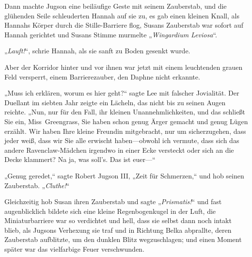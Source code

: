Dann machte Jugson eine beiläufige Geste mit seinem Zauberstab, und die glühenden Seile schleuderten Hannah auf sie zu, es gab einen kleinen Knall, als Hannahs Körper durch die Stille-Barriere flog, Susans Zauberstab war sofort auf Hannah gerichtet und Susans Stimme murmelte „\emph{Wingardium Leviosa}“.

„\emph{Lauft!}“, schrie Hannah, als sie sanft zu Boden gesenkt wurde.

Aber der Korridor hinter und vor ihnen war jetzt mit einem leuchtenden grauen Feld versperrt, einem Barrierezauber, den Daphne nicht erkannte.

„Muss ich erklären, worum es hier geht?“ sagte Lee mit falscher Jovialität. Der Duellant im siebten Jahr zeigte ein Lächeln, das nicht bis zu seinen Augen reichte. „Nun, nur für den Fall, ihr kleinen Unannehmlichkeiten, und das schließt Sie ein, Miss~Greengrass, Sie haben schon genug Ärger gemacht und genug Lügen erzählt. Wir haben Ihre kleine Freundin mitgebracht, nur um sicherzugehen, dass jeder weiß, dass wir Sie alle erwischt haben—obwohl ich vermute, dass sich das andere Ravenclaw-Mädchen irgendwo in einer Ecke versteckt oder sich an die Decke klammert? Na ja, was soll’s. Das ist euer—“

„Genug geredet,“ sagte Robert Jugson III, „Zeit für Schmerzen,“ und hob seinen Zauberstab. „\emph{Cluthe!}“

Gleichzeitig hob Susan ihren Zauberstab und sagte „\emph{Prismatis!}“ und fast augenblicklich bildete sich eine kleine Regenbogenkugel in der Luft, die Miniaturbarriere war so verdichtet und hell, dass sie selbst dann noch intakt blieb, als Jugsons Verhexung sie traf und in Richtung Belka abprallte, deren Zauberstab aufblitzte, um den dunklen Blitz wegzuschlagen; und einen Moment später war das vielfarbige Feuer verschwunden.


